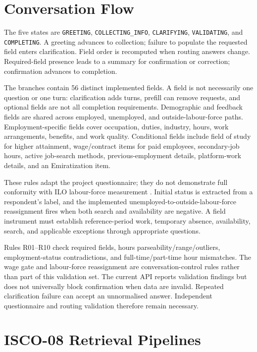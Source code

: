 \section{Conversation Flow}
\label{sec:arch-fsm}

The five states are \texttt{GREETING}, \texttt{COLLECTING\_INFO},
\texttt{CLARIFYING}, \texttt{VALIDATING}, and \texttt{COMPLETING}.
A greeting advances to collection; failure to populate the requested
field enters clarification. Field order is recomputed when routing
answers change. Required-field presence leads to a summary for
confirmation or correction; confirmation advances to completion.

The branches contain 56 distinct implemented fields. A field is not
necessarily one question or one turn: clarification adds turns, prefill
can remove requests, and optional fields are not all completion
requirements. Demographic and feedback fields are shared across employed,
unemployed, and outside-labour-force paths. Employment-specific fields
cover occupation, duties, industry, hours, work arrangements, benefits,
and work quality. Conditional fields include field of study for higher
attainment, wage/contract items for paid employees, secondary-job hours,
active job-search methods, previous-employment details, platform-work
details, and an Emiratization item.

These rules adapt the project questionnaire; they do not demonstrate
full conformity with ILO labour-force measurement
\cite{ilo2013workstats}. Initial status is extracted from a respondent's
label, and the implemented unemployed-to-outside-labour-force reassignment
fires when both search and availability are negative. A field instrument
must establish reference-period work, temporary absence, availability,
search, and applicable exceptions through appropriate questions.

Rules R01--R10 check required fields, hours parseability/range/outliers,
employment-status contradictions, and full-time/part-time hour mismatches.
The wage gate and labour-force reassignment are conversation-control
rules rather than part of this validation set. The current API reports
validation findings but does not universally block confirmation when
data are invalid. Repeated clarification failure can accept an
unnormalised answer. Independent questionnaire and routing validation
therefore remain necessary.

\section{ISCO-08 Retrieval Pipelines}
\label{sec:arch-rag}


